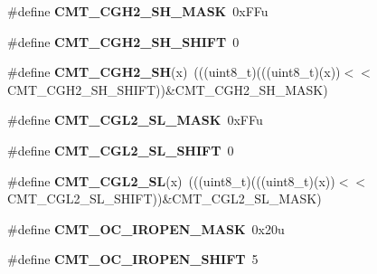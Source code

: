\begin{DoxyCompactItemize}
\item 
\#define {\bfseries C\+M\+T\+\_\+\+C\+G\+H2\+\_\+\+S\+H\+\_\+\+M\+A\+SK}~0x\+F\+Fu\hypertarget{group__CMT__Register__Masks_ga8637e794f015ee608b47a547e35a72ea}{}\label{group__CMT__Register__Masks_ga8637e794f015ee608b47a547e35a72ea}

\item 
\#define {\bfseries C\+M\+T\+\_\+\+C\+G\+H2\+\_\+\+S\+H\+\_\+\+S\+H\+I\+FT}~0\hypertarget{group__CMT__Register__Masks_gafcef3256a8434ecb052c1e6fa0226459}{}\label{group__CMT__Register__Masks_gafcef3256a8434ecb052c1e6fa0226459}

\item 
\#define {\bfseries C\+M\+T\+\_\+\+C\+G\+H2\+\_\+\+SH}(x)~(((uint8\+\_\+t)(((uint8\+\_\+t)(x))$<$$<$C\+M\+T\+\_\+\+C\+G\+H2\+\_\+\+S\+H\+\_\+\+S\+H\+I\+FT))\&C\+M\+T\+\_\+\+C\+G\+H2\+\_\+\+S\+H\+\_\+\+M\+A\+SK)\hypertarget{group__CMT__Register__Masks_ga95219b8b12ea826848dec3d3287a1b7b}{}\label{group__CMT__Register__Masks_ga95219b8b12ea826848dec3d3287a1b7b}

\item 
\#define {\bfseries C\+M\+T\+\_\+\+C\+G\+L2\+\_\+\+S\+L\+\_\+\+M\+A\+SK}~0x\+F\+Fu\hypertarget{group__CMT__Register__Masks_gafd7f251bad02bcf7549874db413adcf9}{}\label{group__CMT__Register__Masks_gafd7f251bad02bcf7549874db413adcf9}

\item 
\#define {\bfseries C\+M\+T\+\_\+\+C\+G\+L2\+\_\+\+S\+L\+\_\+\+S\+H\+I\+FT}~0\hypertarget{group__CMT__Register__Masks_ga5a5d53932d1fcce0a0f2e9fc29400df8}{}\label{group__CMT__Register__Masks_ga5a5d53932d1fcce0a0f2e9fc29400df8}

\item 
\#define {\bfseries C\+M\+T\+\_\+\+C\+G\+L2\+\_\+\+SL}(x)~(((uint8\+\_\+t)(((uint8\+\_\+t)(x))$<$$<$C\+M\+T\+\_\+\+C\+G\+L2\+\_\+\+S\+L\+\_\+\+S\+H\+I\+FT))\&C\+M\+T\+\_\+\+C\+G\+L2\+\_\+\+S\+L\+\_\+\+M\+A\+SK)\hypertarget{group__CMT__Register__Masks_ga78f805fee13018151bbb94de65001f7e}{}\label{group__CMT__Register__Masks_ga78f805fee13018151bbb94de65001f7e}

\item 
\#define {\bfseries C\+M\+T\+\_\+\+O\+C\+\_\+\+I\+R\+O\+P\+E\+N\+\_\+\+M\+A\+SK}~0x20u\hypertarget{group__CMT__Register__Masks_ga7f61dcc57756388d9e913eb3653c2e58}{}\label{group__CMT__Register__Masks_ga7f61dcc57756388d9e913eb3653c2e58}

\item 
\#define {\bfseries C\+M\+T\+\_\+\+O\+C\+\_\+\+I\+R\+O\+P\+E\+N\+\_\+\+S\+H\+I\+FT}~5\hypertarget{group__CMT__Register__Masks_ga0d1d56279862ab5f549e82bd9c25b0f2}{}\label{group__CMT__Register__Masks_ga0d1d56279862ab5f549e82bd9c25b0f2}


\end{DoxyCompactItemize}
